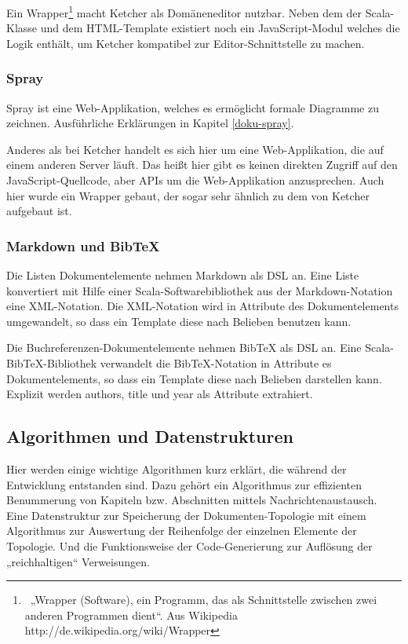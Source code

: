  
Ein Wrapper\footnote{~„Wrapper (Software), ein Programm, das als Schnittstelle zwischen zwei anderen Programmen dient“. Aus Wikipedia http://de.wikipedia.org/wiki/Wrapper} macht Ketcher als Domäneneditor nutzbar. Neben dem der Scala-Klasse und dem HTML-Template existiert noch ein JavaScript-Modul welches die Logik enthält, um Ketcher kompatibel zur Editor-Schnittstelle zu machen.

 
\subsubsection{Spray}\label{}

 
Spray ist eine Web-Applikation, welches es ermöglicht formale Diagramme zu zeichnen. Ausführliche Erklärungen in Kapitel \ref{doku-spray}.

 
Anderes als bei Ketcher handelt es sich hier um eine Web-Applikation, die auf einem anderen Server läuft. Das heißt hier gibt es keinen direkten Zugriff auf den JavaScript-Quellcode, aber APIs um die Web-Applikation anzusprechen. Auch hier wurde ein Wrapper gebaut, der sogar sehr ähnlich zu dem von Ketcher aufgebaut ist.

 
\subsubsection{Markdown und BibTeX}\label{}

 
Die Listen Dokumentelemente nehmen Markdown als DSL an. Eine Liste konvertiert mit Hilfe einer Scala-Softwarebibliothek aus der Markdown-Notation eine XML-Notation. Die XML-Notation wird in Attribute des Dokumentelements umgewandelt, so dass ein Template diese nach Belieben benutzen kann.

 
Die Buchreferenzen-Dokumentelemente nehmen BibTeX als DSL an. Eine Scala-BibTeX-Bibliothek verwandelt die BibTeX-Notation in Attribute es Dokumentelements, so dass ein Template diese nach Belieben darstellen kann. Explizit werden authors, title und year als Attribute extrahiert.

 
\subsection{Algorithmen und Datenstrukturen}\label{}
 
Hier werden einige wichtige Algorithmen kurz erklärt, die während der Entwicklung entstanden sind. Dazu gehört ein Algorithmus zur effizienten Benummerung von Kapiteln bzw. Abschnitten mittels Nachrichtenaustausch. Eine Datenstruktur zur Speicherung der Dokumenten-Topologie mit einem Algorithmus zur Auswertung der Reihenfolge der einzelnen Elemente der Topologie. Und die Funktionsweise der Code-Generierung zur Auflösung der „reichhaltigen“ Verweisungen.

